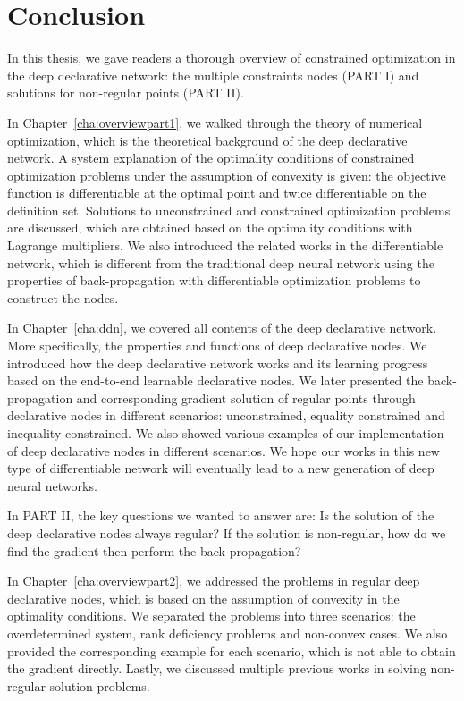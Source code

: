 \chapter{Conclusion}
\label{cha:conc}
In this thesis, we gave readers a thorough overview of constrained optimization in the deep declarative network: the multiple constraints nodes (PART I) and solutions for non-regular points (PART II). 
\par In Chapter~\ref{cha:overviewpart1}, we walked through the theory of numerical optimization, which is the theoretical background of the deep declarative network. A system explanation of the optimality conditions of constrained optimization problems under the assumption of convexity is given: the objective function is differentiable at the optimal point and twice differentiable on the definition set. Solutions to unconstrained and constrained optimization problems are discussed, which are obtained based on the optimality conditions with Lagrange multipliers. We also introduced the related works in the differentiable network, which is different from the traditional deep neural network using the properties of back-propagation with differentiable optimization problems to construct the nodes.
\par In Chapter~\ref{cha:ddn}, we covered all contents of the deep declarative network. More specifically, the properties and functions of deep declarative nodes. We introduced how the deep declarative network works and its learning progress based on the end-to-end learnable declarative nodes. We later presented the back-propagation and corresponding gradient solution of regular points through declarative nodes in different scenarios: unconstrained, equality constrained and inequality constrained. We also showed various examples of our implementation of deep declarative nodes in different scenarios. We hope our works in this new type of differentiable network will eventually lead to a new generation of deep neural networks.
\par In PART II, the key questions we wanted to answer are: Is the solution of the deep declarative nodes always regular? If the solution is non-regular, how do we find the gradient then perform the back-propagation? 
\par In Chapter~\ref{cha:overviewpart2}, we addressed the problems in regular deep declarative nodes, which is based on the assumption of convexity in the optimality conditions. We separated the problems into three scenarios: the overdetermined system, rank deficiency problems and non-convex cases. We also provided the corresponding example for each scenario, which is not able to obtain the gradient directly. Lastly, we discussed multiple previous works in solving non-regular solution problems. 
